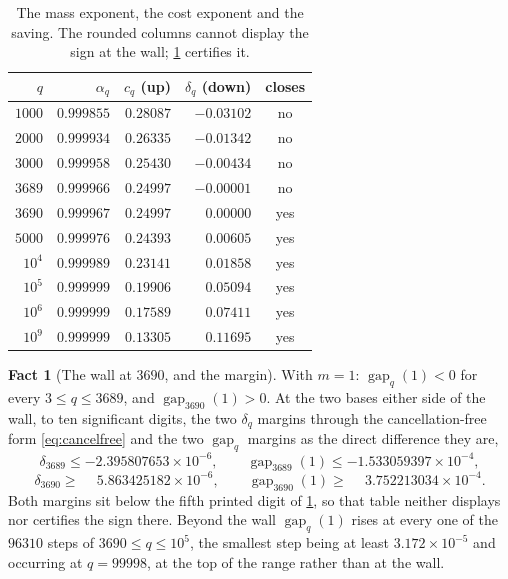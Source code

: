 \documentclass[11pt]{amsart}
\theoremstyle{definition}
\newtheorem{fact}[theorem]{Fact}
\theoremstyle{remark}
\begin{document}
\begin{table}[h]
\centering
\begin{tabular}{rrrrc}
\toprule
$q$ & $\alpha_q$ & $c_q$ (up) & $\delta_q$ (down) & closes \\
\midrule
$1000$ & $0.999855$ & $0.28087$ & $-0.03102$ & no \\
$2000$ & $0.999934$ & $0.26335$ & $-0.01342$ & no \\
$3000$ & $0.999958$ & $0.25430$ & $-0.00434$ & no \\
$3689$ & $0.999966$ & $0.24997$ & $-0.00001$ & no \\
$3690$ & $0.999967$ & $0.24997$ & $0.00000$ & yes \\
$5000$ & $0.999976$ & $0.24393$ & $0.00605$ & yes \\
$10^4$ & $0.999989$ & $0.23141$ & $0.01858$ & yes \\
$10^5$ & $0.999999$ & $0.19906$ & $0.05094$ & yes \\
$10^6$ & $0.999999$ & $0.17589$ & $0.07411$ & yes \\
$10^9$ & $0.999999$ & $0.13305$ & $0.11695$ & yes \\
\bottomrule
\end{tabular}
\caption{The mass exponent, the cost exponent and the saving. The rounded columns cannot display the sign at the wall; \cref{fact:wall} certifies it.}
\label{tab:main}
\end{table}

\begin{fact}[The wall at $3690$, and the margin]
\label{fact:wall}
With $m = 1$: $\operatorname{gap}_q(1) < 0$ for every $3 \le q \le 3689$, and $\operatorname{gap}_{3690}(1) > 0$. At the two bases either side of the wall, to ten significant digits, the two $\delta_q$ margins through the cancellation-free form \eqref{eq:cancelfree} and the two $\operatorname{gap}_q$ margins as the direct difference they are,
\[
  \delta_{3689} \le -2.395807653 \times 10^{-6}, \qquad \operatorname{gap}_{3689}(1) \le -1.533059397 \times 10^{-4},
\]
\[
  \delta_{3690} \ge \phantom{-}5.863425182 \times 10^{-6}, \qquad \operatorname{gap}_{3690}(1) \ge \phantom{-}3.752213034 \times 10^{-4} .
\]
Both margins sit below the fifth printed digit of \cref{tab:main}, so that table neither displays nor certifies the sign there. Beyond the wall $\operatorname{gap}_q(1)$ rises at every one of the $96310$ steps of $3690 \le q \le 10^5$, the smallest step being at least $3.172 \times 10^{-5}$ and occurring at $q = 99998$, at the top of the range rather than at the wall.
\end{fact}
\end{document}
